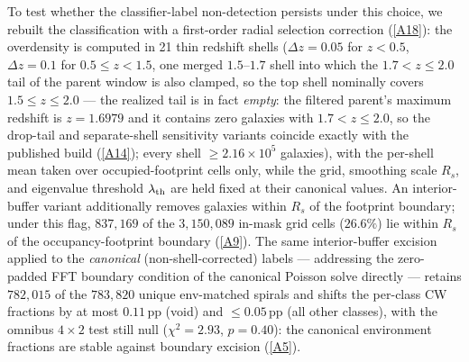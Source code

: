 \documentclass[aps,prd,twocolumn,superscriptaddress,showpacs,preprintnumbers,nofootinbib,longbibliography,floatfix]{revtex4-2}
\newcommand{\repoBase}{https://github.com/Hubify-Projects/bigbounce/blob/main}
\begin{document}
To test whether the classifier-label non-detection persists under this
choice, we rebuilt the classification with a first-order radial
selection correction
(\href{\repoBase/pipelines/p5\_desi\_chirality/scripts/16\_cosmic\_web\_zshell\_corrected.py}{[A18]}): the
overdensity is computed in 21 thin redshift shells ($\Delta z = 0.05$
for $z<0.5$, $\Delta z = 0.1$ for $0.5 \le z < 1.5$, one merged
$1.5$--$1.7$ shell into which the $1.7 < z \le 2.0$ tail of
the parent window is also clamped, so the top shell nominally
covers $1.5 \le z \le 2.0$ --- the realized tail is in fact
\emph{empty}: the filtered parent's maximum redshift is
$z = 1.6979$ and it contains zero galaxies with $1.7 < z \le 2.0$,
so the drop-tail and separate-shell sensitivity variants coincide
exactly with the published build
(\href{\repoBase/pipelines/p5\_desi\_chirality/outputs/24\_r24conf\_pod\_session.json}{[A14]});
every shell $\ge 2.16\times10^5$
galaxies), with the
per-shell mean taken over occupied-footprint cells only, while the
grid, smoothing scale $R_s$, and eigenvalue threshold
$\lambda_{\rm th}$ are held fixed at their canonical values. An
interior-buffer variant additionally removes galaxies within $R_s$ of
the footprint boundary; under this flag, $837{,}169$ of the
$3{,}150{,}089$ in-mask grid cells ($26.6\%$) lie within $R_s$ of the
occupancy-footprint boundary
(\href{\repoBase/pipelines/p5\_desi\_chirality/outputs/22\_r24conf\_local\_batch.json}{[A9]}). The same interior-buffer excision applied to
the \emph{canonical} (non-shell-corrected) labels — addressing the
zero-padded FFT boundary condition of the canonical Poisson solve
directly — retains $782{,}015$ of the $783{,}820$ unique env-matched
spirals and shifts the per-class CW fractions by at most $0.11$\,pp
(void) and $\le 0.05$\,pp (all other classes), with the omnibus
$4\times2$ test still null ($\chi^2 = 2.93$, $p = 0.40$): the
canonical environment fractions are stable against boundary
excision
(\href{\repoBase/pipelines/p5\_desi\_chirality/outputs/21\_r23conf\_meta\_closures.json}{[A5]}).
\end{document}

